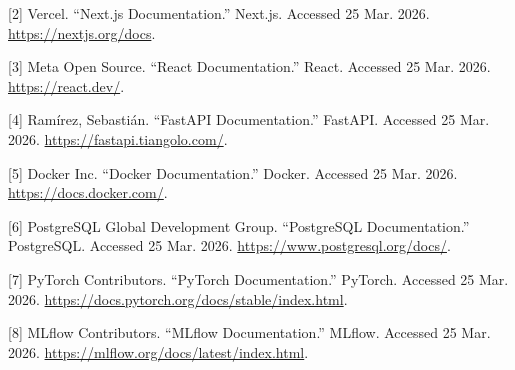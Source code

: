 \documentclass[12pt,a4paper]{report}
\begin{document}
[2] Vercel. ``Next.js Documentation.'' Next.js. Accessed 25 Mar. 2026. \url{https://nextjs.org/docs}.

[3] Meta Open Source. ``React Documentation.'' React. Accessed 25 Mar. 2026. \url{https://react.dev/}.

[4] Ram\'irez, Sebasti\'an. ``FastAPI Documentation.'' FastAPI. Accessed 25 Mar. 2026. \url{https://fastapi.tiangolo.com/}.

[5] Docker Inc. ``Docker Documentation.'' Docker. Accessed 25 Mar. 2026. \url{https://docs.docker.com/}.

[6] PostgreSQL Global Development Group. ``PostgreSQL Documentation.'' PostgreSQL. Accessed 25 Mar. 2026. \url{https://www.postgresql.org/docs/}.

[7] PyTorch Contributors. ``PyTorch Documentation.'' PyTorch. Accessed 25 Mar. 2026. \url{https://docs.pytorch.org/docs/stable/index.html}.

[8] MLflow Contributors. ``MLflow Documentation.'' MLflow. Accessed 25 Mar. 2026. \url{https://mlflow.org/docs/latest/index.html}.
\end{document}
